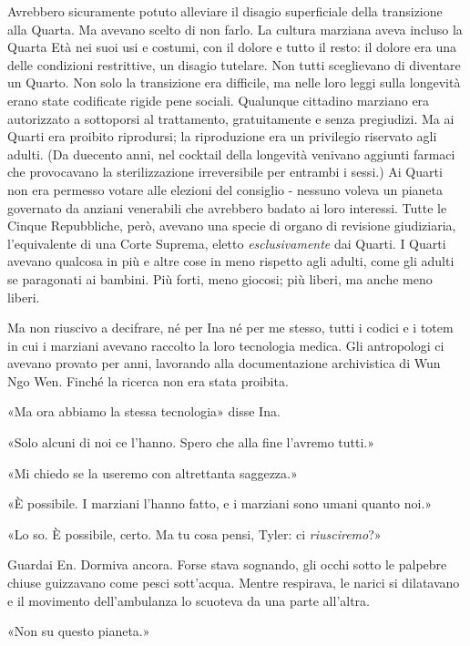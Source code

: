 Avrebbero sicuramente potuto alleviare il disagio superficiale della
transizione alla Quarta. Ma avevano scelto di non farlo. La cultura
marziana aveva incluso la Quarta Età nei suoi usi e costumi, con il
dolore e tutto il resto: il dolore era una delle condizioni restrittive,
un disagio tutelare. Non tutti sceglievano di diventare un Quarto. Non
solo la transizione era difficile, ma nelle loro leggi sulla longevità
erano state codificate rigide pene sociali. Qualunque cittadino marziano
era autorizzato a sottoporsi al trattamento, gratuitamente e senza
pregiudizi. Ma ai Quarti era proibito riprodursi; la riproduzione era un
privilegio riservato agli adulti. (Da duecento anni, nel cocktail della
longevità venivano aggiunti farmaci che provocavano la sterilizzazione
irreversibile per entrambi i sessi.) Ai Quarti non era permesso votare
alle elezioni del consiglio - nessuno voleva un pianeta governato da
anziani venerabili che avrebbero badato ai loro interessi. Tutte le
Cinque Repubbliche, però, avevano una specie di organo di revisione
giudiziaria, l'equivalente di una Corte Suprema, eletto
\emph{esclusivamente} dai Quarti. I Quarti avevano qualcosa in più e
altre cose in meno rispetto agli adulti, come gli adulti se paragonati
ai bambini. Più forti, meno giocosi; più liberi, ma anche meno liberi.

Ma non riuscivo a decifrare, né per Ina né per me stesso, tutti i codici
e i totem in cui i marziani avevano raccolto la loro tecnologia medica.
Gli antropologi ci avevano provato per anni, lavorando alla
documentazione archivistica di Wun Ngo Wen. Finché la ricerca non era
stata proibita.

«Ma ora abbiamo la stessa tecnologia» disse Ina.

«Solo alcuni di noi ce l'hanno. Spero che alla fine l'avremo tutti.»

«Mi chiedo se la useremo con altrettanta saggezza.»

«È possibile. I marziani l'hanno fatto, e i marziani sono umani quanto
noi.»

«Lo so. È possibile, certo. Ma tu cosa pensi, Tyler: ci
\emph{riusciremo}?»

Guardai En. Dormiva ancora. Forse stava sognando, gli occhi sotto le
palpebre chiuse guizzavano come pesci sott'acqua. Mentre respirava, le
narici si dilatavano e il movimento dell'ambulanza lo scuoteva da una
parte all'altra.

«Non su questo pianeta.»

\separatorefiori

